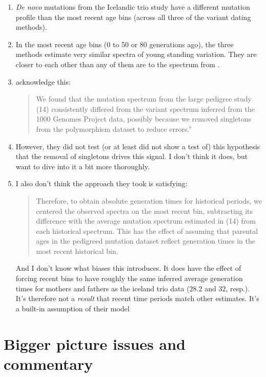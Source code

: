 \documentclass[]{article}
\begin{document}
\begin{enumerate}
    \item \emph{De novo} mutations from the Icelandic trio study have
        a different mutation profile than the most recent age bins
        (across all three of the variant dating methods).
    \item In the most recent age bins (0 to 50 or 80 generations ago),
        the three methods estimate very similar spectra of young standing
        variation. They are closer to each other than any of them are
        to the spectrum from \citet{jonsson2017parental}.
    \item \citet{wang2023human} acknowledge this:
        \begin{quote}
            We found that the mutation spectrum from the large pedigree study
            (14) consistently differed from the variant spectrum inferred from
            the 1000 Genomes Project data, possibly because we removed
            singletons from the polymorphism dataset to reduce errors.''
        \end{quote}
    \item However, they did not test (or at least did not show a test of)
        this hypothesis that the removal of singletons drives this signal.
        I don't think it does, but want to dive into it a bit more
        thoroughly.
    \item I also don't think the approach they took is satisfying:
        \begin{quote}
            Therefore, to obtain absolute generation times for historical
            periods, we centered the observed spectra on the most recent bin,
            subtracting its difference with the average mutation spectrum
            estimated in (14) from each historical spectrum.  This has the
            effect of assuming that parental ages in the pedigreed mutation
            dataset reflect generation times in the most recent historical bin.
        \end{quote}
        And I don't know what biases this introduces. It does have the effect
        of forcing recent bins to have roughly the same inferred average
        generation times for mothers and fathers as the iceland trio data
        ($28.2$ and $32$, resp.). It's therefore not a \emph{result} that
        recent time periods match other estimates. It's a built-in assumption
        of their model
\end{enumerate}

\section{Bigger picture issues and commentary}
\end{document}
